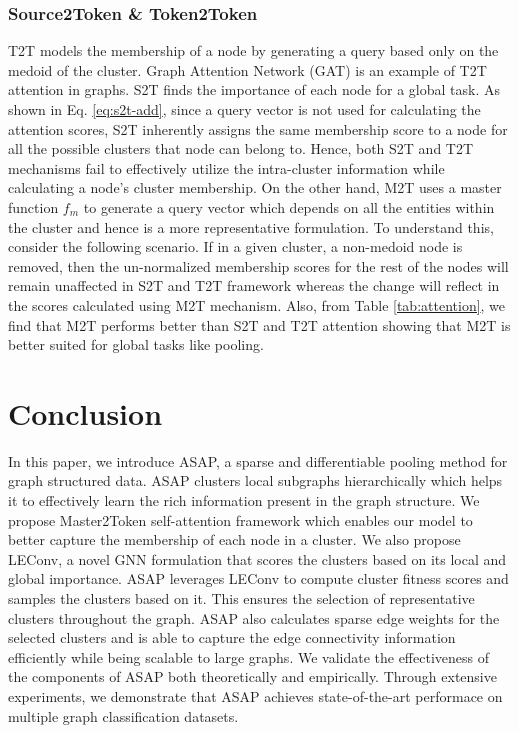 \documentclass[letterpaper]{article} \usepackage{aaai20}  \usepackage{times}  \usepackage{helvet} \usepackage{courier}  \usepackage[hyphens]{url}  \usepackage{graphicx} \urlstyle{rm} \def\UrlFont{\rm}  \usepackage{graphicx}  \frenchspacing  \setlength{\pdfpagewidth}{8.5in}  \setlength{\pdfpageheight}{11in}
\begin{document}
\subsubsection{Source2Token \& Token2Token}
T2T models the membership of a node by generating a query based only on the medoid of the cluster. Graph Attention Network (GAT) \cite{gat} is an example of T2T attention in graphs. S2T finds the importance of each node for a global task. As shown in Eq. \ref{eq:s2t-add}, since a query vector is not used for calculating the attention scores, S2T inherently assigns the same membership score to a node for all the possible clusters that node can belong to. Hence, both S2T and T2T mechanisms fail to effectively utilize the intra-cluster information while calculating a node's cluster membership. On the other hand, M2T uses a master function $f_{m}$ to generate a query vector which depends on all the entities within the cluster and hence is a more representative formulation. To understand this, consider the following scenario. If in a given cluster, a non-medoid node is removed, then the un-normalized membership scores for the rest of the nodes will remain unaffected in S2T and T2T framework whereas the change will reflect in the scores calculated using M2T mechanism. Also, from Table \ref{tab:attention}, we find that M2T performs better than S2T and T2T attention showing that M2T is better suited for global tasks like pooling.

%
 
\section{Conclusion}
In this paper, we introduce ASAP, a sparse and differentiable pooling method for graph structured data. ASAP clusters local subgraphs hierarchically which helps it to effectively learn the rich information present in the graph structure. We propose Master2Token self-attention framework which enables our model to better capture the membership of each node in a cluster. We also propose LEConv, a novel GNN formulation that scores the clusters based on its local and global importance. ASAP leverages LEConv to compute cluster fitness scores and samples the clusters based on it. This ensures the selection of representative clusters throughout the graph. ASAP also calculates sparse edge weights for the selected clusters and is able to capture the edge connectivity information efficiently while being scalable to large graphs. We validate the effectiveness of the components of ASAP both theoretically and empirically. Through extensive experiments, we demonstrate that ASAP achieves state-of-the-art performace on multiple graph classification datasets.
\end{document}
